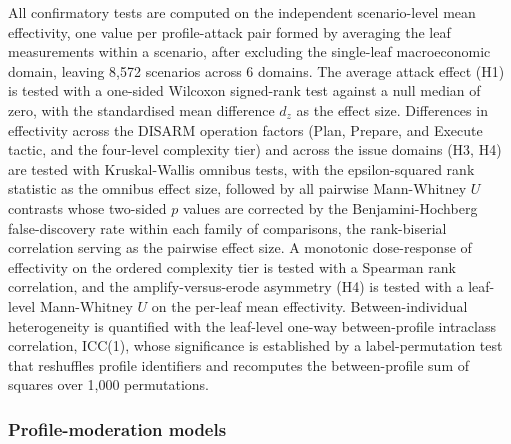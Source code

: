 \documentclass[11pt,a4paper]{article}
\begin{document}
All confirmatory tests are computed on the independent scenario-level mean effectivity, one value
per profile-attack pair formed by averaging the leaf measurements within a scenario, after
excluding the single-leaf macroeconomic domain, leaving 8,572 scenarios across 6 domains. The
average attack effect (H1) is tested with a one-sided Wilcoxon signed-rank test against a null
median of zero, with the standardised mean difference $d_z$ as the effect size. Differences in
effectivity across the DISARM operation factors (Plan, Prepare, and Execute tactic, and the
four-level complexity tier) and across the issue domains (H3, H4) are tested with Kruskal-Wallis
omnibus tests, with the epsilon-squared rank statistic as the omnibus effect size, followed by
all pairwise Mann-Whitney $U$ contrasts whose two-sided $p$ values are corrected by the
Benjamini-Hochberg false-discovery rate within each family of comparisons, the rank-biserial
correlation serving as the pairwise effect size. A monotonic dose-response of effectivity on the
ordered complexity tier is tested with a Spearman rank correlation, and the amplify-versus-erode
asymmetry (H4) is tested with a leaf-level Mann-Whitney $U$ on the per-leaf mean effectivity.
Between-individual heterogeneity is quantified with the leaf-level one-way between-profile
intraclass correlation, ICC(1), whose significance is established by a label-permutation test that
reshuffles profile identifiers and recomputes the between-profile sum of squares over 1,000
permutations.

\subsubsection{Profile-moderation models}
\end{document}
